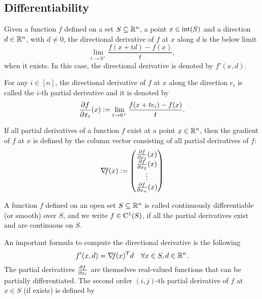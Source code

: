 \documentclass[10pt,a4paper]{article}
\begin{document}
\subsection{Differentiability}
\begin{definition}
	Given a function $f$ defined on a set $S\subseteq \mathbb{R}^n$, a point $x\in \mathord{\mathrm{int}}(S)$ and a direction $d\in \mathbb{R}^n$, with $d\neq0$, the directional derivative of $f$ at $x$ along $d$ is the below limit
	\begin{equation*}
		\lim_{t\to 0^+} \frac{f(x+td)-f(x)}{t},
	\end{equation*}
when it exists. In this case, the directional derivative is denoted by $f'(x,d)$.
\end{definition}
\begin{definition}
For any $i\in[n]$, the directional derivative of $f$ at $x$ along the direction $e_i$ is called the $i$-th partial derivative and it is denoted by 
\begin{equation*}
	\frac{\partial f}{\partial x_i}(x):=\lim_{t\to 0^+} \frac{f(x+te_i)-f(x)}{t}.
\end{equation*}
\end{definition}
\begin{definition}[Gradient]
	If all partial derivatives of a function $f$ exist at a point $x\in\mathbb{R}^n$, then the gradient of $f$ at $x$ is defined by the column vector consisting of all partial derivatives of $f$:
	\begin{equation*}
		\operatorname*{\mathit{\nabla \!f}} (x) := \begin{pmatrix}
			\frac{\partial f}{\partial x_1}(x)\\
			\frac{\partial f}{\partial x_2}(x)\\
			\vdots\\
			\frac{\partial f}{\partial x_n}(x)
		\end{pmatrix}
	\end{equation*}
\end{definition}
\noindent A function $f$ defined on an open set $S \subseteq \mathbb{R}^n$ is called continuously differentiable (or smooth) over $S$, and we write $f\in \mathord{\mathrm{C^1}}(S)$, if all the partial derivatives exist and are continuous on $S$.
\par An important formula to compute the directional derivative is the following
\begin{equation*}
	f'(x,d) = \operatorname*{\mathit{\nabla \!f}}(x)^Td \quad \forall x \in S, d\in \mathbb{R}^n.
\end{equation*}
The partial derivatives $\frac{\partial f}{\partial x_i}$ are themselves real-valued functions that can be partially differentiated. The second order $(i,j)$-th partial derivative of $f$ at $x\in S$ (if exists) is defined by
\end{document}
